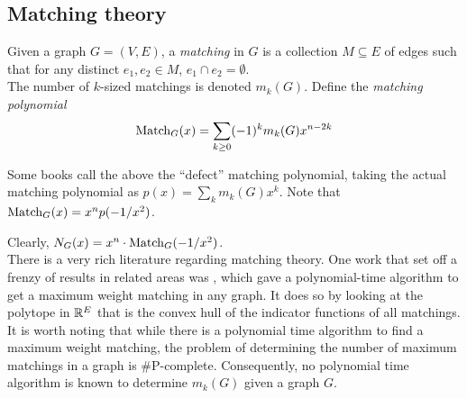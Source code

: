

\subsection{Matching theory}

	\begin{fdef}[Matching]
		Given a graph $G = (V,E)$, a \emph{matching} in $G$ is a collection $M \subseteq E$ of edges such that for any distinct $e_1,e_2 \in M$, $e_1 \cap e_2 = \emptyset$.\\
		The number of $k$-sized matchings is denoted $m_k(G)$. Define the \emph{matching polynomial}
		\[ \operatorname{Match}_G(x) = \sum_{k \ge 0} (-1)^k m_k(G) x^{n-2k} \]
	\end{fdef}
	Some books call the above the ``defect'' matching polynomial, taking the actual matching polynomial as $p(x) = \sum_k m_k(G) x^k$. Note that $\operatorname{Match}_G(x) = x^n p(-1/x^2)$. 
	
	Clearly, $N_G(x) = x^n \cdot \operatorname{Match}_G(-1/x^2)$.\\

	There is a very rich literature regarding matching theory. One work that set off a frenzy of results in related areas was \cite{Edmonds1965MaximumMA}, which gave a polynomial-time algorithm to get a maximum weight matching in any graph. It does so by looking at the polytope in $\mathbb{R}^{E}$ that is the convex hull of the indicator functions of all matchings.
	It is worth noting that while there is a polynomial time algorithm to find a maximum weight matching, the problem of determining the number of maximum matchings in a graph is \textsf{\#P}-complete. Consequently, no polynomial time algorithm is known to determine $m_k(G)$ given a graph $G$.\\

